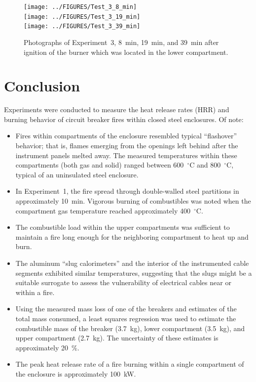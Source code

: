 \documentclass[12pt]{article}
\begin{document}
\begin{figure}[p]
\centering
\texttt{[image: ../FIGURES/Test\_3\_8\_min]} \\
\texttt{[image: ../FIGURES/Test\_3\_19\_min]} \\
\texttt{[image: ../FIGURES/Test\_3\_39\_min]}
\caption[Photographs of Experiment~3]{Photographs of Experiment~3, 8~min, 19~min, and 39~min after ignition of the burner which was located in the lower compartment.}
\label{fig:Test_3_photos}
\end{figure}



\clearpage

\section{Conclusion}

Experiments were conducted to measure the heat release rates (HRR) and burning behavior of circuit breaker fires within closed steel enclosures. Of note:
\begin{itemize}
\item Fires within compartments of the enclosure resembled typical  ``flashover'' behavior; that is, flames emerging from the openings left behind after the instrument panels melted away. The measured temperatures within these compartments (both gas and solid) ranged between 600~$^\circ$C and 800~$^\circ$C, typical of an uninsulated steel enclosure.
\item In Experiment~1, the fire spread through double-walled steel partitions in approximately 10~min. Vigorous burning of combustibles was noted when the compartment gas temperature reached approximately 400~$^\circ$C.
\item The combustible load within the upper compartments was sufficient to maintain a fire long enough for the neighboring compartment to heat up and burn.
\item The aluminum ``slug calorimeters'' and the interior of the instrumented cable segments exhibited similar temperatures, suggesting that the slugs might be a suitable surrogate to assess the vulnerability of electrical cables near or within a fire.
\item Using the measured mass loss of one of the breakers and estimates of the total mass consumed, a least squares regression was used to estimate the combustible mass of the breaker (3.7~kg), lower compartment (3.5~kg), and upper compartment (2.7~kg). The uncertainty of these estimates is approximately 20~\%.
\item The peak heat release rate of a fire burning within a single compartment of the enclosure is approximately 100~kW.
\end{itemize}
\end{document}
